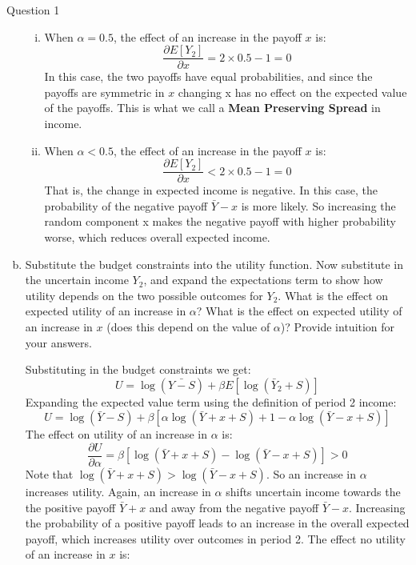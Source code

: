 \documentclass[a4paper]{article}
\newif\IfInSansMode
\begin{document}
\begin{questionbox}{Question 1}
\begin{enumerate}[(a)]
\begin{explanationbox}
\begin{enumerate}[(i)]
					\item When \( \alpha = 0.5 \), the effect of an increase in the payoff \( x \) is:
					\[
						\frac{\partial E[Y_2]}{\partial x} = 2 \times 0.5 - 1 = 0
					\]
					In this case, the two payoﬀs have equal probabilities, and since the payoﬀs are symmetric in \( x \) changing x has no eﬀect on the expected value of the payoﬀs. This is what we call a \textbf{\textcolor{mygreen}{Mean Preserving Spread}} in income.
					\item When \( \alpha < 0.5 \), the effect of an increase in the payoff \( x \) is:
					\[
						\frac{\partial E[Y_2]}{\partial x} < 2 \times 0.5 - 1 = 0
					\]
					That is, the change in expected income is negative. In this case, the probability of the negative payoﬀ \( \bar{Y} - x \) is more likely. So increasing the random component x makes the negative payoff with higher probability worse, which reduces overall expected income.
				\end{enumerate}
			\end{explanationbox}\pagebreak
			\item Substitute the budget constraints into the utility function. Now substitute in the uncertain income \( Y_2 \), and expand the expectations term to show how utility depends on the two possible outcomes for \( Y_2 \). What is the eﬀect on expected utility of an increase in \( \alpha \)? What is the eﬀect on expected utility of an increase in \( x \) (does this depend on the value of \( \alpha \))? Provide intuition for your answers.
			\begin{explanationbox}
				Substituting in the budget constraints we get:
				\[
					U = \log (\bar{Y - S}) + \beta E\left[ \log(\bar{Y}_2 + S) \right]
				\]
				Expanding the expected value term using the deﬁnition of period 2 income:
				\[
					U = \log (\bar{Y}- S) + \beta[\alpha\log(\bar{Y} + x + S) + 1-\alpha \log(\bar{Y} - x + S)]
				\]
				The effect on utility of an increase in \( \alpha \) is:
				\[
					\frac{\partial U}{\partial \alpha} = \beta\left[ \log(\bar{Y} + x + S) - \log(\bar{Y} - x + S) \right] > 0
				\]
				Note that \( \log(\bar{Y} + x + S) > \log(\bar{Y} - x + S) \). So an increase in \( \alpha \) increases utility. Again, an increase in \( \alpha \) shifts uncertain income towards the the positive payoff \( \bar{Y} + x \) and away from the negative payoff \( \bar{Y} - x \). Increasing the probability of a positive payoﬀ leads to an increase in the overall expected payoﬀ, which increases utility over outcomes in period 2. The eﬀect no utility of an increase in \( x \) is:

\end{explanationbox}
\end{enumerate}
\end{questionbox}
\end{document}

